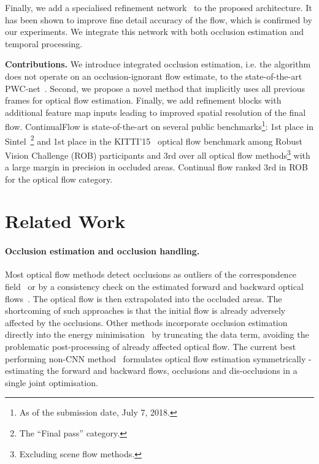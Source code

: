 \documentclass[runningheads]{llncs}
\begin{document}
Finally, we add a specialised refinement network~\cite{Ilg2016,Pang2017} to the proposed architecture.
It has been shown to improve fine detail accuracy of the flow, which is confirmed by our experiments.
We integrate this network with both occlusion estimation and temporal processing.

{\bf Contributions.}  We introduce integrated occlusion estimation, i.e. the algorithm does not operate on an occlusion-ignorant flow estimate,
to the state-of-the-art PWC-net~\cite{Sun2017}. 
Second, we propose a novel method that implicitly uses all previous frames for optical flow estimation. 
Finally, we add refinement blocks with additional feature map inputs leading to improved spatial resolution  of the final flow.
ContinualFlow  is state-of-the-art on several public benchmarks\footnote{As of the submission date, July 7, 2018.}: 1st place in Sintel~\cite{Butler2012}\footnote	{The ``Final pass'' category.} and 1st place in the KITTI'15~\cite{Menze2015} optical flow benchmark among Robust Vision Challenge (ROB) participants and 3rd over all optical flow methods\footnote{Excluding scene flow methods.} with a large margin in precision in occluded areas. Continual flow ranked 3rd in ROB~\cite{RVC2018} for the  optical flow category.


 


\section{Related Work}

\paragraph{\bf Occlusion estimation and occlusion handling.} 
Most optical flow methods detect occlusions as outliers of the correspondence field~\cite{Bailer2015,Gueney2016,Bailer2017} or by a consistency check on the estimated forward and backward optical flows~\cite{Sundaram2010,Chen2016}.
The optical flow is then extrapolated into the occluded areas.
The shortcoming of such approaches is that the initial flow is already adversely affected by the occlusions.
Other methods incorporate occlusion estimation directly into the energy minimisation~\cite{Xiao2006,Unger2012,Sun2014a} by truncating the data term, avoiding the problematic post-processing of already affected optical flow.
The current best performing non-CNN method~\cite{Hur2017} formulates optical flow estimation symmetrically - estimating the forward and backward flows, occlusions and dis-occlusions in a single joint optimisation.
\end{document}
